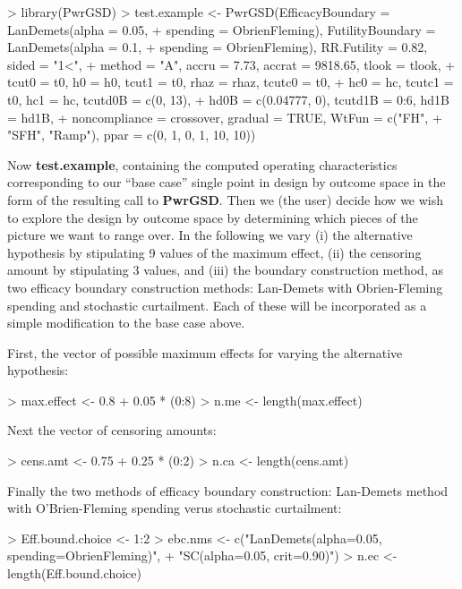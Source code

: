 \documentclass{article}
\begin{document}
\begin{Schunk}
\begin{Sinput}
> library(PwrGSD)
> test.example <- PwrGSD(EfficacyBoundary = LanDemets(alpha = 0.05, 
+     spending = ObrienFleming), FutilityBoundary = LanDemets(alpha = 0.1, 
+     spending = ObrienFleming), RR.Futility = 0.82, sided = "1<", 
+     method = "A", accru = 7.73, accrat = 9818.65, tlook = tlook, 
+     tcut0 = t0, h0 = h0, tcut1 = t0, rhaz = rhaz, tcutc0 = t0, 
+     hc0 = hc, tcutc1 = t0, hc1 = hc, tcutd0B = c(0, 13), 
+     hd0B = c(0.04777, 0), tcutd1B = 0:6, hd1B = hd1B, 
+     noncompliance = crossover, gradual = TRUE, WtFun = c("FH", 
+         "SFH", "Ramp"), ppar = c(0, 1, 0, 1, 10, 10))
\end{Sinput}
\end{Schunk}

Now {\bf test.example}, containing the computed operating characteristics
corresponding to our ``base case'' single point in design by outcome space in
the form of the resulting call to {\bf PwrGSD}.  Then we (the user) decide
how we wish to explore the design by outcome space by determining which pieces
of the picture we want to range over.  In the following we vary (i) the
alternative hypothesis by stipulating 9 values of the maximum effect, (ii) the
censoring amount by stipulating 3 values, and (iii) the boundary construction
method, as two efficacy boundary construction methods: Lan-Demets with
Obrien-Fleming spending and stochastic curtailment. Each of these will be
incorporated as a simple modification to the base case above.  

First, the vector of possible maximum effects for varying the alternative hypothesis:
\begin{Schunk}
\begin{Sinput}
> max.effect <- 0.8 + 0.05 * (0:8)
> n.me <- length(max.effect)
\end{Sinput}
\end{Schunk}

Next the vector of censoring amounts:
\begin{Schunk}
\begin{Sinput}
> cens.amt <- 0.75 + 0.25 * (0:2)
> n.ca <- length(cens.amt)
\end{Sinput}
\end{Schunk}

Finally the two methods of efficacy boundary construction: Lan-Demets method
with O'Brien-Fleming spending verus stochastic curtailment:  
\begin{Schunk}
\begin{Sinput}
> Eff.bound.choice <- 1:2
> ebc.nms <- c("LanDemets(alpha=0.05, spending=ObrienFleming)", 
+     "SC(alpha=0.05, crit=0.90)")
> n.ec <- length(Eff.bound.choice)
\end{Sinput}
\end{Schunk}
\end{document}
